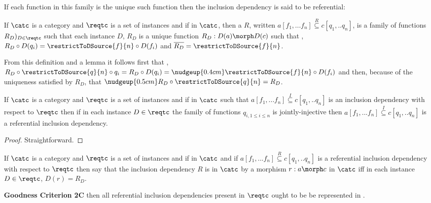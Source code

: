 If each function in this family is the unique such function then the inclusion dependency is said to be referential:


\begin{definition}
If $\catc$ is a  category and $\reqtc$ is a set of instances 
and if
\fnsourceqnsource
in $\catc$, then a  $R$, written $a[f_1,...f_n] \overset{R}{\subseteq} c[q_1,..q_n]$, is a family of functions $R_D)_{D \in \reqtc}$
such that each instance $D$, 
$R_D$ is a unique function $R_D : D(a) \morph D(c)$ such that
\foreachi,
    $R_D \circ D(q_i) = \restrictToDSource{f}{n} \circ D(f_i)$
and $\overline{R_D}=\restrictToDSource{f}{n}$.
\end{definition}

From this definition and a lemma  
it follows 
first that \foreachi, 
$R_D \circ \restrictToDSource{q}{n} \circ q_i = R_D \circ D(q_i) = \nudgeup{0.4cm}\restrictToDSource{f}{n} \circ D(f_i)$ 
and then, because of the uniqueness satisfied by $R_D$, that
$\nudgeup{0.5cm}R_D \circ \restrictToDSource{q}{n} = R_D$.

\begin{lemma}
If $\catc$ is a category and $\reqtc$ is a set of instances and if
\fnsourceqnsource
in $\catc$
such that $a[f_1,...f_n] \overset{I}{\subseteq} c[q_1,..q_n]$ is an inclusion dependency with respect  to $\reqtc$ then if in each instance $D \in \reqtc$ the family of functions
$q_{i, 1 \leq i \leq n}$ is jointly-injective then $a[f_1,...f_n] \overset{I}{\subseteq} c[q_1,..q_n]$ is a referential inclusion dependency.
\end{lemma}
\begin{proof}
Straightforward.
\end{proof}

\begin{definition}
If $\catc$ is a category and $\reqtc$ is a set of instances and if
\fnsourceqnsource
in $\catc$ and if $a[f_1,...f_n] \overset{R}{\subseteq} c[q_1,..q_n]$ is a referential inclusion dependency
with respect  to $\reqtc$ then say that the inclusion dependency $R$ is  in $\catc$ by a morphism $r:a \morph c$ in $\catc$
iff in each instance $D \in \reqtc$, $D(r) = R_D$. 
\end{definition}

\textbf {Goodness Criterion 2C} \IfSforCwithRCwords 
then all referential inclusion dependencies present in $\reqtc$
ought to be be represented in \catcp.

